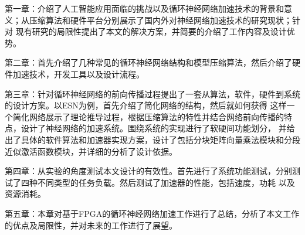 第一章：介绍了人工智能应用面临的挑战以及循环神经网络加速技术的背景和意义；从压缩算法和硬件平台分别展示了国内外对神经网络加速技术的研究现状；针对
现有研究的局限性提出了本文的解决方案，并简要的介绍了工作内容及设计优势。

第二章：首先介绍了几种常见的循环神经网络结构和模型压缩算法，然后介绍了硬件加速技术，开发工具以及设计流程。

第三章：针对循环神经网络的前向传播过程提出了一套从算法，软件，硬件到系统的设计方案。以ESN为例，首先介绍了简化网络的结构，然后就如何获得
这样一个简化网络展示了理论推导过程，根据压缩算法的特性并结合网络前向传播的特点，设计了神经网络的加速系统。围绕系统的实现进行了软硬间功能划分，
并给出了具体的软件算法和加速器实现方案，设计了包括分块矩阵向量乘法模块和分段近似激活函数模块，并详细的分析了设计依据。

第四章：从实验的角度测试本文设计的有效性。首先进行了系统功能测试，分别测试了四种不同类型的任务负载。然后测试了加速器的性能，包括速度，功耗
以及资源消耗。

第五章：本章对基于FPGA的循环神经网络加速工作进行了总结，分析了本文工作的优点及局限性，并对未来的工作进行了展望。

%
%
%
%
%
%
%
%
%
%
%
%
%




